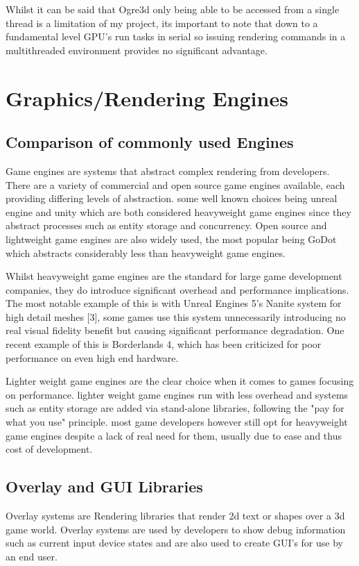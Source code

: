 \documentclass[]{final_report}
\begin{document}
Whilst it can be said that Ogre3d only being able to be accessed from a single thread is a limitation of my project, its important to note that down to a fundamental level GPU's run tasks in serial so issuing rendering commands in a multithreaded environment provides no significant advantage.
\section{Graphics/Rendering Engines}
\subsection{Comparison of commonly used Engines}
Game engines are systems that abstract complex rendering from developers. There are a variety of commercial and open source game engines available, each providing differing levels of abstraction. some well known choices being unreal engine and unity which are both considered heavyweight game engines since they abstract processes such as entity storage and concurrency. Open source and lightweight game engines are also widely used, the most popular being GoDot which abstracts considerably less than heavyweight game engines.

Whilst heavyweight game engines are the standard for large game development companies, they do introduce significant overhead and performance implications. The most notable example of this is with Unreal Engines 5's Nanite system for high detail meshes [3], some games use this system unnecessarily introducing no real visual fidelity benefit but causing significant performance degradation. One recent example of this is Borderlands 4, which has been criticized for poor performance on even high end hardware.

Lighter weight game engines are the clear choice when it comes to games focusing on performance. lighter weight game engines run with less overhead and systems such as entity storage are added via stand-alone libraries, following the "pay for what you use" principle. most game developers however still opt for heavyweight game engines despite a lack of real need for them, usually due to ease and thus cost of development. 

\subsection{Overlay and GUI Libraries}
Overlay systems are Rendering libraries that render 2d text or shapes over a 3d game world. Overlay systems are used by developers to show debug information such as current input device states and are also used to create GUI's for use by an end user. 
\end{document}
